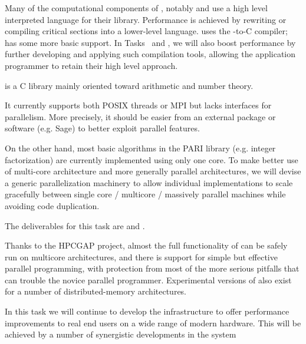 \begin{workpackage}
\begin{wpdescription}
  Many of the computational components of \TheProject, notably \Sage
  and \GAP use a high level
  interpreted language for their library. Performance is achieved by
  rewriting or compiling critical sections into a lower-level
  language. \Sage uses
  the \Cython \Python-to-C compiler; \GAP has some more basic support.
  In Tasks~ and , we will also boost performance by
  further developing and applying such compilation tools, allowing the
  application programmer to retain their high level approach.

\end{wpdescription}
\begin{tasklist}
\begin{task}[title=PARI,id=hpc-pari,PM=20, lead=UB]
  \Pari is a C library mainly oriented toward arithmetic and number theory.
  
  It currently supports both POSIX threads or MPI but lacks interfaces for
  parallelism. More precisely, it should be easier from an external package
  or software (e.g. Sage) to better exploit \Pari parallel features.

  On the other hand, most basic algorithms in the PARI library (e.g. integer
  factorization) are currently implemented using only one core. To
  make better use of multi-core architecture and more generally parallel
  architectures, we will devise a generic parallelization machinery
  to allow individual implementations to scale gracefully between single
  core / multicore / massively parallel machines while avoiding code
  duplication.

  The deliverables for this task are  and .
\end{task}


\begin{task}[title=GAP,id=hpc-gap,PM=18, lead=SA]
  Thanks to the HPCGAP project, almost the full functionality of \GAP
  can be safely run on multicore architectures, and there is support for
  simple but effective parallel programming, with protection from most
  of the more serious pitfalls that can trouble the novice parallel
  programmer. Experimental versions of \GAP also exist for a number of
  distributed-memory architectures.


In this task we will continue to develop the \GAP infrastructure to
offer performance improvements to real end users on a wide range of
modern hardware. This will be achieved by a number of synergistic
developments in the system


\end{task}
\end{tasklist}
\end{workpackage}
